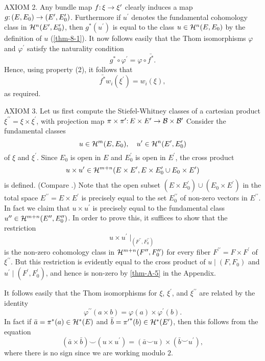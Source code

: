 \noindent\textsf{AXIOM 2.} Any bundle map $\map{f}{\xi}{\xi^{\prime}}$ clearly induces a map $\map{g}{(E, E_{0})}{(E^{\prime}, E_{0}^{\prime})}$. Furthermore if $u^{\prime}$ denotes the fundamental cohomology class in $\mathcal{H}^{ n }(E^{\prime}, E_{0}^{\prime})$, then $g^{*}(u^{\prime})$ is equal to the class $u \in \mathcal{H}^{ n }(E, E_{0})$ by the definition of $u$ (\cref{thm-8-1}). It now follows easily that the Thom isomorphisms $\varphi$ and $\varphi^{\prime}$ satisfy the naturality condition
\[
g^{*} \circ \varphi^{\prime}=\varphi \circ \bar{f^{*}}.
\]
Hence, using property (2), it follows that
\[
\bar{f^{*}} w_{i}(\xi^{\prime})=w_{i}(\xi),
\]
as required.\vspace{.3cm}

\noindent\textsf{AXIOM 3.} Let us first compute the Stiefel-Whitney classes of a cartesian product $\xi^{\prime \prime}=\xi \times \xi^{\prime}$, with projection map $\map{\pi \times \pi^{\prime}}{E \times E^{\prime}}{\B  \times \B ^{\prime}} $ Consider the fundamental classes
\[
u \in \mathcal{H}^{m}(E, E_{0}), \quad u^{\prime} \in \mathcal{H}^{ n }(E^{\prime}, E_{0}^{\prime})
\]
of $\xi$ and $\xi^{\prime}$. Since $E_{0}$ is open in $E$ and $E_{0}^{\prime}$ is open in $E^{\prime}$, the cross product
\[
u \times u^{\prime} \in \mathcal{H}^{m+ n }(E \times E^{\prime}, E \times E_{0}^{\prime} \cup E_{0} \times E^{\prime})
\]
is defined. (Compare .) Note that the open subset $(E \times E_{0}^{\prime})\cup(E_{0} \times E^{\prime})$ in the total space $E^{\prime \prime}=E \times E^{\prime}$ is precisely equal to the set $E_{0}^{\prime \prime}$ of non-zero vectors in $E^{\prime\prime}$. In fact we claim that $u \times u^{\prime}$ is precisely equal to the fundamental class $u^{\prime \prime} \in \mathcal{H}^{m+n}(E^{\prime \prime}, E_{0}^{\prime \prime})$. In order to prove this, it suffices to show that the restriction
\[
u \times u^{\prime} \mid_{(F^{\prime \prime}, F_{0}^{\prime \prime})}
\]
is the non-zero cohomology class in $\mathcal{H}^{m+ n }(F^{\prime \prime}, F_{0}^{\prime \prime})$ for every fiber $F^{\prime \prime}=F \times F^{\prime}$ of $\xi^{\prime \prime}$. But this restriction is evidently equal to the cross product of $u \mid(F, F_{0})$ and $u^{\prime} \mid(F^{\prime}, F_{0}^{\prime})$, and hence is non-zero by \cref{thm-A-5} in the Appendix.

It follows easily that the Thom isomorphisms for $\xi$, $\xi^{\prime}$, and $\xi^{\prime \prime}$ are related by the identity
\[
\varphi^{\prime \prime}(a \times b)=\varphi(a) \times \varphi^{\prime}(b).
\]
In fact if $\bar{a}=\pi^{*}(a) \in \mathcal{H}^{*}(E)$ and $\bar{b}={\pi^{\prime}}^*(b) \in \mathcal{H}^{*}(E^{\prime})$, then this follows from the equation
\[
(\bar{a} \times \bar{b}) \smile(u \times u^{\prime})=(\bar{a} \smile u) \times(\bar{b} \smile u^{\prime}),
\]
where there is no sign since we are working modulo $2$.


